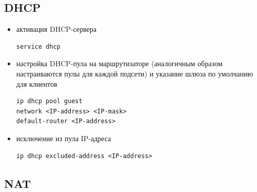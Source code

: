 \subsection{DHCP}

\begin{itemize}
	\item активация DHCP-сервера
	
	\begin{lstlisting}
service dhcp
	\end{lstlisting}
	
	\item настройка DHCP-пула на маршрутизаторе (аналогичным образом настраиваются пулы для каждой подсети) и указание шлюза по умолчанию для клиентов
	
	\begin{lstlisting}
ip dhcp pool guest                             
network <IP-address> <IP-mask>
default-router <IP-address>
	\end{lstlisting}
	
	\item исключение из пула IP-адреса
	
	\begin{lstlisting}
ip dhcp excluded-address <IP-address>
	\end{lstlisting}
\end{itemize}

\subsection{NAT}

